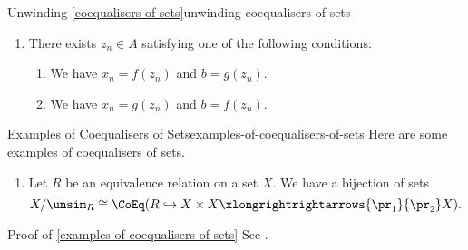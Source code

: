 \begin{remark}{Unwinding \cref{coequalisers-of-sets}}{unwinding-coequalisers-of-sets}
\begin{enumerate}
\begin{enumerate}
\begin{enumerate}
                        \item\label{unwinding-coequalisers-of-sets-2-d-ii} We have $x_{i}=g(z_{i})$ and $x_{i+1}=f(z_{i})$.
                    \end{enumerate}
                \item\label{unwinding-coequalisers-of-sets-2-e} There exists $z_{n}\in A$ satisfying one of the following conditions:
                    \begin{enumerate}
                        \item\label{unwinding-coequalisers-of-sets-2-e-i} We have $x_{n}=f(z_{n})$ and $b=g(z_{n})$.
                        \item\label{unwinding-coequalisers-of-sets-2-e-ii} We have $x_{n}=g(z_{n})$ and $b=f(z_{n})$.
                    \end{enumerate}
            \end{enumerate}
    \end{enumerate}
\end{remark}
\begin{example}{Examples of Coequalisers of Sets}{examples-of-coequalisers-of-sets}%
    Here are some examples of coequalisers of sets.
    \begin{enumerate}
        \item\label{examples-of-coequalisers-of-sets-quotients-by-equivalence-relations}Let $R$ be an equivalence relation on a set $X$. We have a bijection of sets
            \[
                X/\unsim_{R}%
                \cong%
                \CoEq(R\hookrightarrow X\times X\xlongrightrightarrows{\pr_{1}}{\pr_{2}}X).
            \]%
    \end{enumerate}
\end{example}
\begin{Proof}{Proof of \cref{examples-of-coequalisers-of-sets}}%
    See \cite{proof-wiki:quotient-map-is-coequaliser}.
\end{Proof}
